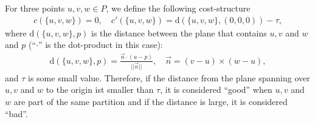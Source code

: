 For three points $u,v,w \in P$, we define the following cost-structure
\begin{align*}
    c(\{u,v,w\}) = 0,\quad c'(\{u,v,w\}) = \mathrm{d}(\{ u,v,w \},(0,0,0)) - \tau,
\end{align*}
where $\mathrm{d}(\{u,v,w\},p)$ is the distance between the plane that contains $u,v$ and $w$ and $p$ (``$\cdot$'' is the dot-product in this case):
\begin{align*}
    \mathrm{d}(\{u,v,w\},p) = \frac{\vec{n} \cdot (u - p)}{||\vec{n}||},\quad \vec{n} = (v-u)\times (w-u),
\end{align*}
and $\tau$ is some small value. Therefore, if the distance from the plane spanning over $u,v$ and $w$ to the origin ist smaller than $\tau$, it is considered ``good'' when $u,v$ and $w$ are part of the same partition and if the distance is large, it is considered ``bad''.

